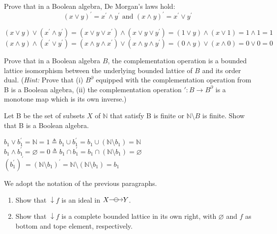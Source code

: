 \documentclass[11pt,a4paper]{exam}
\renewcommand{\emptyset}{\varnothing}
\newcommand{\N}{\mathbb{N}}
\newcommand{\join}{\vee}
\newcommand{\meet}{\wedge}
\newcommand{\arrowcircle}[1][]{%
  \begin{tikzpicture}[#1]
    \draw[->] (0,0ex) -- (2em,0ex);
    \draw (1em,0ex) circle (0.7ex);
  \end{tikzpicture}%
}
\begin{document}
\begin{exo}
    Prove that in a Boolean algebra, De Morgan's laws hold:
    \[
        (x \join y)^\prime = x^\prime \meet y^\prime \text{ and } (x \meet y)^\prime = x^\prime \join y^\prime
    \]

    \begin{sol}
        $(x \join y) \join (x^\prime \meet y^\prime) = (x \join y \join x^\prime) \meet (x \join y \join y^\prime) = (1 \join y) \meet (x \join 1) = 1 \meet 1 = 1$ \\ 
        $(x \meet y) \meet (x^\prime \join y^\prime) = (x \meet y \meet x^\prime) \join (x \meet y \meet y^\prime) = (0 \meet y) \join (x \meet 0) = 0 \join 0 = 0$
    \end{sol}
\end{exo}

\begin{exo}
    Prove that in a Boolean algebra $B$, the complementation operation is a bounded lattice isomorphism between the underlying bounded lattice of $B$ and its order dual. (\textit{Hint:} Prove that (i) $B^\partial$ equipped with the complementation operation from B is a Boolean algebra, (ii) the complementation operation $\prime \colon B \rightarrow B^\partial$ is a monotone map which is its own inverse.)
    
    \begin{sol}
        
    \end{sol}
\end{exo}

\begin{exo}
    Let B be the set of subsets $X$ of $\N$ that satisfy B is finite or $\N \setminus B$ is finite. Show that B is a Boolean algebra.

    \begin{sol}
        $b_1 \join b_1^\prime = \N = 1 \triangleq b_1 \cup b_1^\prime = b_1 \cup (\N \setminus b_1) = \N$ \\ 
        $b_1 \meet b_1^\prime = \emptyset = 0 \triangleq b_1 \cap b_1^\prime = b_1 \cap (\N \setminus b_1) = \emptyset$ \\ 
        $(b_1^\prime)^\prime = (\N \setminus b_1)^\prime = \N \setminus (\N \setminus b_1) = b_1$
    \end{sol}
\end{exo}

\begin{exo}
    We adopt the notation of the previous paragraphs.
    \begin{enumerate}
        \item Show that $\downarrow f$ is an ideal in $X \arrowcircle Y$.
        \item Show that $\downarrow f$ is a complete bounded lattice in its own right, with $\emptyset$ and $f$ as bottom and tope element, respectively.
    \end{enumerate}

    \begin{sol}
        
    \end{sol}
\end{exo}
\end{document}
